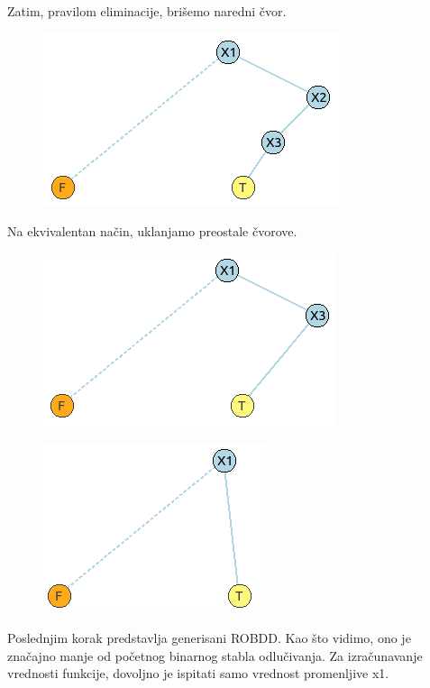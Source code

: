 \begin{exmp}
    Zatim, pravilom eliminacije, bri\v{s}emo naredni \v{c}vor.
    
    \begin{figure}[H]
        \centering
        \includegraphics{slike/primer/06.png}
    \end{figure}
    
    Na ekvivalentan na\v{c}in, uklanjamo preostale \v{c}vorove.
    
    \begin{figure}[H]
        \centering
        \includegraphics{slike/primer/07.png}
    \end{figure}
        
    \begin{figure}[H]
        \centering
        \includegraphics{slike/primer/08.png}
    \end{figure}
    
    Poslednjim korak predstavlja generisani ROBDD. Kao \v{s}to vidimo, ono je zna\v{c}ajno manje od po\v{c}etnog binarnog stabla odlu\v{c}ivanja. Za izra\v{c}unavanje vrednosti funkcije, dovoljno je ispitati samo vrednost promenljive x1.
    
\end{exmp}



